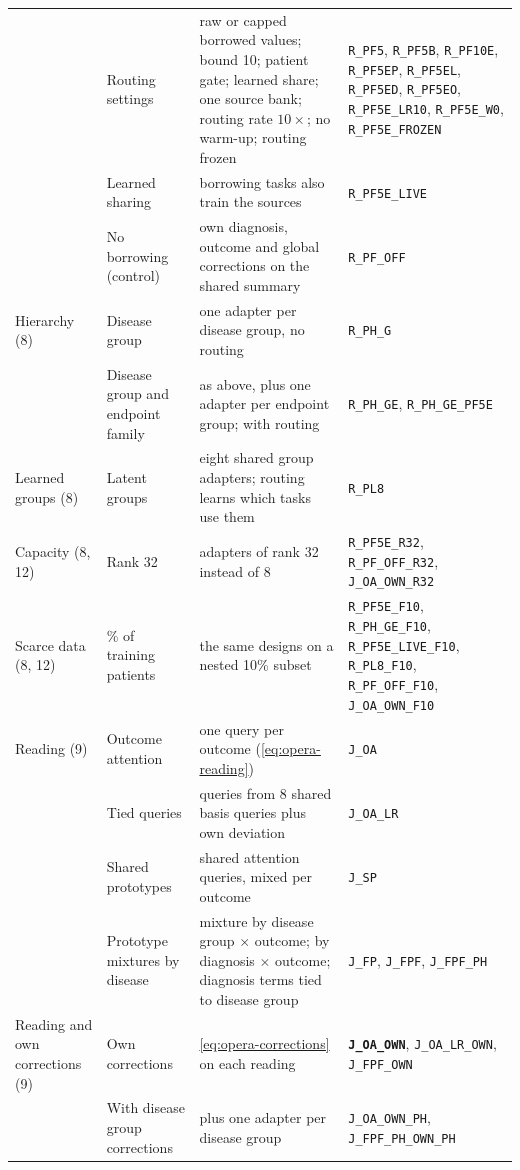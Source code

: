 \begin{table}[htbp]
\begin{tabularx}{\textwidth}{@{}>{\raggedright\arraybackslash}p{}>{\raggedright\arraybackslash}p{}>{\raggedright\arraybackslash}X>{\raggedright\arraybackslash}p{}@{}}
 & Routing settings & raw or capped borrowed values; bound 10; patient gate; learned share; one source bank; routing rate $10\times$; no warm-up; routing frozen & \texttt{R\_PF5}, \texttt{R\_PF5B}, \texttt{R\_PF10E}, \texttt{R\_PF5EP}, \texttt{R\_PF5EL}, \texttt{R\_PF5ED}, \texttt{R\_PF5EO}, \texttt{R\_PF5E\_LR10}, \texttt{R\_PF5E\_W0}, \texttt{R\_PF5E\_FROZEN} \\
 & Learned sharing & borrowing tasks also train the sources & \texttt{R\_PF5E\_LIVE} \\
 & No borrowing (control) & own diagnosis, outcome and global corrections on the shared summary & \texttt{R\_PF\_OFF} \\
Hierarchy (8) & Disease group & one adapter per disease group, no routing & \texttt{R\_PH\_G} \\
 & Disease group and endpoint family & as above, plus one adapter per endpoint group; with routing & \texttt{R\_PH\_GE}, \texttt{R\_PH\_GE\_PF5E} \\
Learned groups (8) & Latent groups & eight shared group adapters; routing learns which tasks use them & \texttt{R\_PL8} \\
Capacity (8, 12) & Rank 32 & adapters of rank 32 instead of 8 & \texttt{R\_PF5E\_R32}, \texttt{R\_PF\_OFF\_R32}, \texttt{J\_OA\_OWN\_R32} \\
Scarce data (8, 12) & 10\% of training patients & the same designs on a nested 10\% subset & \texttt{R\_PF5E\_F10}, \texttt{R\_PH\_GE\_F10}, \texttt{R\_PF5E\_LIVE\_F10}, \texttt{R\_PL8\_F10}, \texttt{R\_PF\_OFF\_F10}, \texttt{J\_OA\_OWN\_F10} \\
Reading (9) & Outcome attention & one query per outcome (\cref{eq:opera-reading}) & \texttt{J\_OA} \\
 & Tied queries & queries from 8 shared basis queries plus own deviation & \texttt{J\_OA\_LR} \\
 & Shared prototypes & 10 shared attention queries, mixed per outcome & \texttt{J\_SP} \\
 & Prototype mixtures by disease & mixture by disease group $\times$ outcome; by diagnosis $\times$ outcome; diagnosis terms tied to disease group & \texttt{J\_FP}, \texttt{J\_FPF}, \texttt{J\_FPF\_PH} \\
Reading and own corrections (9) & Own corrections & \cref{eq:opera-corrections} on each reading & \textbf{\texttt{J\_OA\_OWN}}, \texttt{J\_OA\_LR\_OWN}, \texttt{J\_FPF\_OWN} \\
 & With disease group corrections & plus one adapter per disease group & \texttt{J\_OA\_OWN\_PH}, \texttt{J\_FPF\_PH\_OWN\_PH} \\

\end{tabularx}
\end{table}
